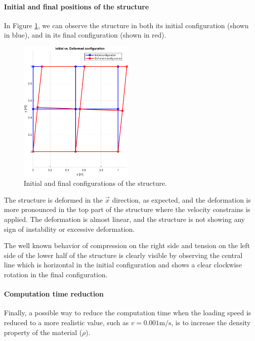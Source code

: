 \paragraph{Initial and final positions of the structure}

In Figure \ref{fig:initial_vs_final}, we can observe the structure in both its initial configuration (shown in blue), and in its final configuration (shown in red).

\begin{figure}[H]
    \centering
    \includegraphics[width=0.5\textwidth]{img/initial_vs_final.png}
    \caption{Initial and final configurations of the structure.}
    \label{fig:initial_vs_final}
\end{figure}

The structure is deformed in the $\vec{x}$ direction, as expected, and the deformation is more pronounced in the top part of the structure where the velocity constrains is applied.
The deformation is almost linear, and the structure is not showing any sign of instability or excessive deformation.

The well known behavior of compression on the right side and tension on the left side of the lower half of the structure is clearly visible by observing the central line which is horizontal in the initial configuration and shows a clear clockwise rotation in the final configuration.


\paragraph{Computation time reduction}

Finally, a possible way to reduce the computation time when the loading speed is reduced to a more realistic value, such as $v = 0.001 \text{m/s}$, is to increase the density property of the material ($\rho$).

